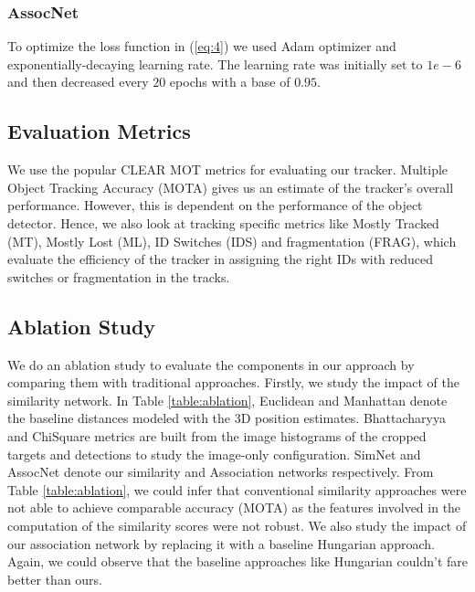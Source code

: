 \documentclass[letterpaper, 10 pt, conference]{ieeeconf}
\begin{document}
\subsubsection{AssocNet} To optimize the loss function in (\ref{eq:4}) we used Adam optimizer and exponentially-decaying learning rate. The learning rate was initially set to $1e-6$ and then decreased every $20$ epochs with a base of $0.95$.

\subsection{Evaluation Metrics}
We use the popular CLEAR MOT metrics \cite{bernardin2008evaluating} for evaluating our tracker. Multiple Object Tracking Accuracy (MOTA) gives us an estimate of the tracker's overall performance. However, this is dependent on the performance of the object detector. Hence, we also look at tracking specific metrics like Mostly Tracked (MT), Mostly Lost (ML), ID Switches (IDS) and fragmentation (FRAG), which evaluate the efficiency of the tracker in assigning the right IDs with reduced switches or fragmentation in the tracks.  

\subsection{Ablation Study}
We do an ablation study to evaluate the components in our approach by comparing them with traditional approaches. Firstly, we study the impact of the similarity network. In Table \ref{table:ablation}, Euclidean and Manhattan denote the baseline distances modeled with the 3D position estimates. Bhattacharyya and ChiSquare metrics are built from the image histograms of the cropped targets and detections to study the image-only configuration. SimNet and AssocNet denote our similarity and Association networks respectively. From Table \ref{table:ablation}, we could infer that conventional similarity approaches were not able to achieve comparable accuracy (MOTA) as the features involved in the computation of the similarity scores were not robust. We also study the impact of our association network by replacing it with a baseline Hungarian approach. Again, we could observe that the baseline approaches like Hungarian couldn't fare better than ours.
\end{document}
